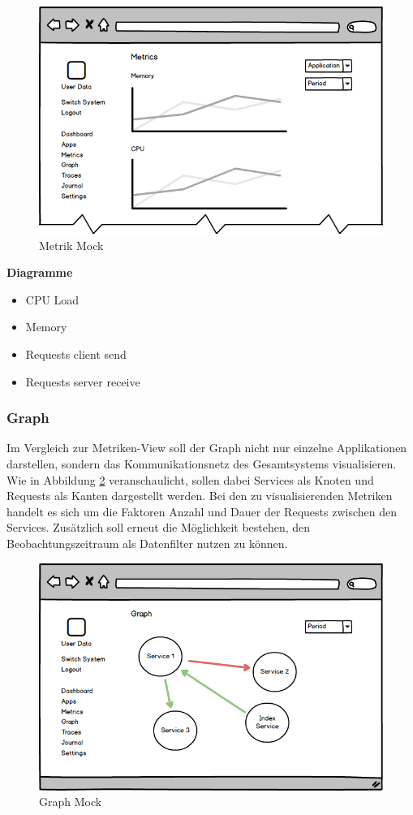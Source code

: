 \vspace{0.3cm}

\begin{figure}[h]
 \centering
 \includegraphics[width=0.6\linewidth]{kapitel1/mocks/metrics.png}
 \caption{Metrik Mock}
  \label{fig:metrics}
\end{figure}

\textbf{Diagramme}

\begin{itemize}
\item CPU Load
\item Memory
\item Requests client send
\item Requests server receive
\end{itemize}


\subsubsection{Graph}

Im Vergleich zur Metriken-View soll der Graph nicht nur einzelne Applikationen darstellen,
sondern das Kommunikationsnetz des Gesamtsystems visualisieren.
Wie in Abbildung \ref{fig:graph} veranschaulicht, sollen dabei Services als Knoten und Requests als Kanten dargestellt werden.
Bei den zu visualisierenden Metriken handelt es sich um die Faktoren Anzahl und Dauer der Requests zwischen den Services.
Zusätzlich soll erneut die Möglichkeit bestehen, den Beobachtungszeitraum als Datenfilter nutzen zu können.
\vspace{0.3cm}

\begin{figure}[h]
 \centering
 \includegraphics[width=0.6\linewidth]{kapitel1/mocks/graph.png}
 \caption{Graph Mock}
 \label{fig:graph}
\end{figure}

